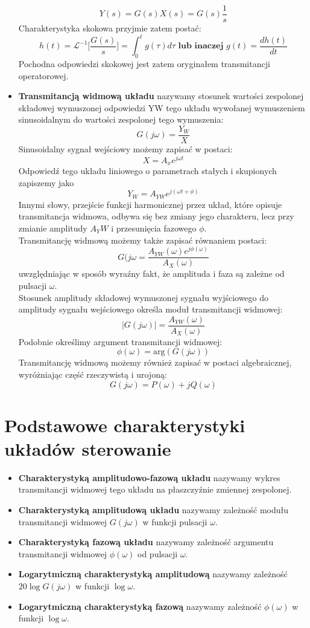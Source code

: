 \documentclass[a4paper]{article}
\begin{document}
\begin{itemize}
$$ Y(s) = G(s)X(s) = G(s)\frac{1}{s} $$
Charakterystyka skokowa przyjmie zatem postać:
$$ h(t) = \mathcal{L}^{-1} \bigg[ \frac{G(s)}{s} \bigg] = \int^t_0 g(\tau)d\tau
\textbf{\ \ lub inaczej \ \ } g(t) = \frac{dh(t)}{dt}$$
Pochodna odpowiedzi skokowej jest zatem oryginałem transmitancji operatorowej. \pagebreak
\item \textbf{Transmitancją widmową układu} nazywamy stosunek wartości zespolonej składowej wymuszonej odpowiedzi YW tego układu wywołanej wymuszeniem sinusoidalnym do wartości zespolonej tego wymuszenia:
$$ G(j\omega)=\frac{Y_W}{X} $$
Sinusoidalny sygnał wejściowy możemy zapisać w postaci: $$X = A_x e^{j\omega t}$$ Odpowiedź tego układu liniowego o parametrach stałych i skupionych zapiszemy jako $$Y_W = A_{YW}e^{j(\omega t + \phi)} $$
Innymi słowy, przejście funkcji harmonicznej przez układ, które opisuje transmitancja widmowa, odbywa się bez zmiany jego charakteru, lecz przy zmianie amplitudy $A_YW$ i przesunięcia fazowego $\phi$.\\
Transmitancję widmową możemy także zapisać równaniem postaci:
$$G(j \omega = \frac{A_{YW}(\omega) e^{j \phi (\omega)}}{A_X(\omega)}$$
uwzględniając w sposób wyraźny fakt, że amplituda i faza są zależne od pulsacji $\omega$. \\
Stosunek amplitudy składowej wymuszonej sygnału wyjściowego do amplitudy sygnału wejściowego określa moduł transmitancji widmowej:
$$|G(j\omega)|=\frac{A_{YW}(\omega)}{A_X(\omega)}$$
Podobnie określimy argument transmitancji widmowej:
$$\phi(\omega) = \text{arg}(G(j\omega))$$
Transmitancję widmową możemy również zapisać w postaci algebraicznej, wyróżniając część rzeczywistą i urojoną: 
$$G(j\omega) = P(\omega) + jQ(\omega) $$
\end{itemize}
\section{Podstawowe charakterystyki układów sterowanie}
\begin{itemize}
\item \textbf{Charakterystyką amplitudowo-fazową układu} nazywamy wykres transmitancji widmowej tego układu na płaszczyźnie zmiennej zespolonej.
\item \textbf{Charakterystyką amplitudową układu} nazywamy zależność modułu transmitancji widmowej $G(j\omega)$ w funkcji pulsacji $\omega$.
\item \textbf{Charakterystyką fazową układu} nazywamy zależność argumentu transmitancji widmowej $\phi(\omega)$ od pulsacji $\omega$.
\item \textbf{Logarytmiczną charakterystyką amplitudową} nazywamy zależność $20 \log G(j\omega)$ w funkcji $\log \omega$.
\item \textbf{Logarytmiczną charakterystyką fazową} nazywamy zależność $\phi(\omega)$ w funkcji $\log \omega$. \pagebreak
\end{itemize}
\end{document}
